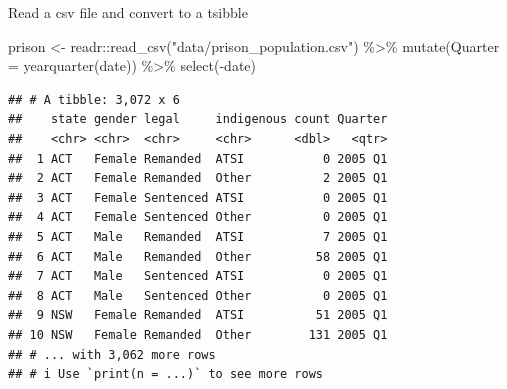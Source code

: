 \documentclass[14pt,ignorenonframetext,aspectratio=169]{beamer}
\newenvironment{Shaded}{\begin{snugshade}}{\end{snugshade}}
\newcommand{\AttributeTok}[1]{\textcolor[rgb]{0.77,0.63,0.00}{#1}}
\newcommand{\FunctionTok}[1]{\textcolor[rgb]{0.00,0.00,0.00}{#1}}
\newcommand{\NormalTok}[1]{#1}
\newcommand{\OtherTok}[1]{\textcolor[rgb]{0.56,0.35,0.01}{#1}}
\newcommand{\SpecialCharTok}[1]{\textcolor[rgb]{0.00,0.00,0.00}{#1}}
\newcommand{\StringTok}[1]{\textcolor[rgb]{0.31,0.60,0.02}{#1}}
\renewenvironment{Shaded}{\color{black}\begin{snugshade}\color{black}}{\end{snugshade}}
\renewenvironment{Shaded}{\color{black}\fontsize{10}{10}\sf\begin{snugshade}\color{black}}{\end{snugshade}}
\begin{document}
\begin{frame}[fragile]{Read a csv file and convert to a tsibble}
\protect\hypertarget{read-a-csv-file-and-convert-to-a-tsibble-2}{}
\fontsize{10}{11}\sf

\begin{Shaded}
\begin{Highlighting}[]
\NormalTok{prison }\OtherTok{\textless{}{-}}\NormalTok{ readr}\SpecialCharTok{::}\FunctionTok{read\_csv}\NormalTok{(}\StringTok{"data/prison\_population.csv"}\NormalTok{) }\SpecialCharTok{\%\textgreater{}\%}
  \FunctionTok{mutate}\NormalTok{(}\AttributeTok{Quarter =} \FunctionTok{yearquarter}\NormalTok{(date)) }\SpecialCharTok{\%\textgreater{}\%}
  \FunctionTok{select}\NormalTok{(}\SpecialCharTok{{-}}\NormalTok{date)}
\end{Highlighting}
\end{Shaded}

\begin{verbatim}
## # A tibble: 3,072 x 6
##    state gender legal     indigenous count Quarter
##    <chr> <chr>  <chr>     <chr>      <dbl>   <qtr>
##  1 ACT   Female Remanded  ATSI           0 2005 Q1
##  2 ACT   Female Remanded  Other          2 2005 Q1
##  3 ACT   Female Sentenced ATSI           0 2005 Q1
##  4 ACT   Female Sentenced Other          0 2005 Q1
##  5 ACT   Male   Remanded  ATSI           7 2005 Q1
##  6 ACT   Male   Remanded  Other         58 2005 Q1
##  7 ACT   Male   Sentenced ATSI           0 2005 Q1
##  8 ACT   Male   Sentenced Other          0 2005 Q1
##  9 NSW   Female Remanded  ATSI          51 2005 Q1
## 10 NSW   Female Remanded  Other        131 2005 Q1
## # ... with 3,062 more rows
## # i Use `print(n = ...)` to see more rows
\end{verbatim}
\end{frame}
\end{document}
